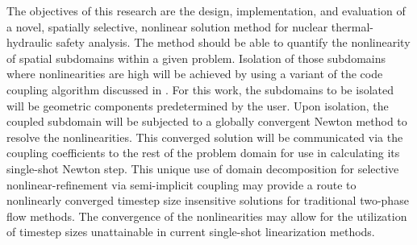 The objectives of this research are the design, implementation, and evaluation of a novel, spatially selective, nonlinear solution method for nuclear thermal-hydraulic safety analysis.
The method should be able to quantify the nonlinearity of spatial subdomains within a given problem.
Isolation of those subdomains where nonlinearities are high will be achieved by using a variant of the code coupling algorithm discussed in .
For this work, the subdomains to be isolated will be geometric components predetermined by the user.
Upon isolation, the coupled subdomain will be subjected to a globally convergent Newton method to resolve the nonlinearities.
This converged solution will be communicated via the coupling coefficients to the rest of the problem domain for use in calculating its single-shot Newton step.
This unique use of domain decomposition for selective nonlinear-refinement via semi-implicit coupling may provide a route to nonlinearly converged timestep size insensitive solutions for traditional two-phase flow methods.
The convergence of the nonlinearities may allow for the utilization of timestep sizes unattainable in current single-shot linearization methods.